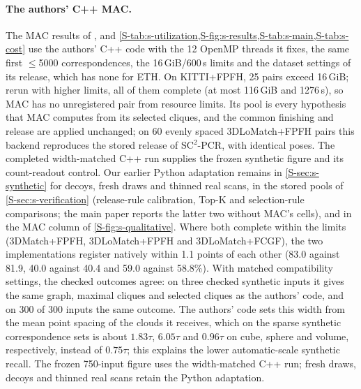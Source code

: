 \paragraph{The authors' C++ MAC.}\label{S-sec:s-maccpp} The MAC results of ,  and \cref{S-tab:s-utilization,S-fig:s-results,S-tab:s-main,S-tab:s-cost} use the authors' C++ code with the 12 OpenMP threads it fixes, the same first $\le$5000 correspondences, the 16\,GiB/600\,s limits and the dataset settings of its release, which has none for ETH. On KITTI+FPFH, 25 pairs exceed 16\,GiB; rerun with higher limits, all of them complete (at most 116\,GiB and 1276\,s), so MAC has no unregistered pair from resource limits. Its pool is every hypothesis that MAC computes from its selected cliques, and the common finishing and release are applied unchanged; on 60 evenly spaced 3DLoMatch+FPFH pairs this backend reproduces the stored release of SC$^2$-PCR, with identical poses. The completed width-matched C++ run supplies the frozen synthetic figure and its count-readout control. Our earlier Python adaptation remains in \cref{S-sec:s-synthetic} for decoys, fresh draws and thinned real scans, in the stored pools of \cref{S-sec:s-verification} (release-rule calibration, Top-K and selection-rule comparisons; the main paper reports the latter two without MAC's cells), and in the MAC column of \cref{S-fig:s-qualitative}. Where both complete within the limits (3DMatch+FPFH, 3DLoMatch+FPFH and 3DLoMatch+FCGF), the two implementations register natively within 1.1 points of each other (83.0 against 81.9, 40.0 against 40.4 and 59.0 against 58.8\%). With matched compatibility settings, the checked outcomes agree: on three checked synthetic inputs it gives the same graph, maximal cliques and selected cliques as the authors' code, and on 300 of 300 inputs the same outcome. The authors' code sets this width from the mean point spacing of the clouds it receives, which on the sparse synthetic correspondence sets is about $1.83\tau$, $6.05\tau$ and $0.96\tau$ on cube, sphere and volume, respectively, instead of $0.75\tau$; this explains the lower automatic-scale synthetic recall. The frozen 750-input figure uses the width-matched C++ run; fresh draws, decoys and thinned real scans retain the Python adaptation.

\begin{table}[t]
\caption[Official criterion]{GeoTransformer's official criterion (registration recall \%, scene mean) on its own correspondences. ``+ finishing'': the finishing step's own choice among up to 32 refined candidates; ``+ release'': the training-free release assay; ``+ learned release'': the optional learned assay. Bold: best per column.}
\label{S-tab:s-official}
\centering\footnotesize
\setlength{\tabcolsep}{4pt}


\end{table}


